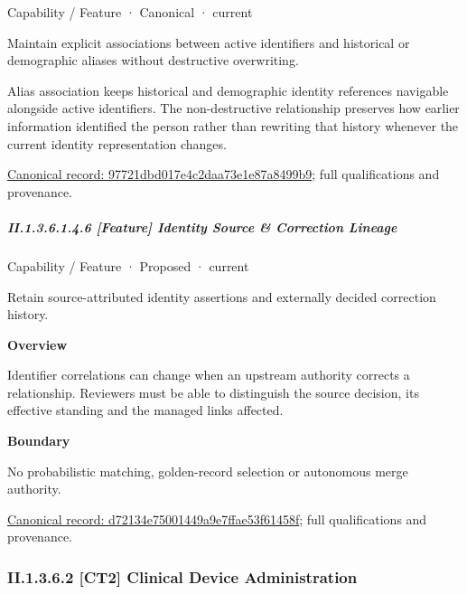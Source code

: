 \label{element:97721dbd017e4c2daa73e1e87a8499b9}
{\small Capability / Feature · Canonical · current}\par

Maintain explicit associations between active identifiers and historical or demographic aliases without destructive overwriting.



Alias association keeps historical and demographic identity references navigable alongside active identifiers. The non-destructive relationship preserves how earlier information identified the person rather than rewriting that history whenever the current identity representation changes.


{\footnotesize \href{../../../../continuum/strategy/capability/feature/97721dbd017e4c2daa73e1e87a8499b9.md}{Canonical record: 97721dbd017e4c2daa73e1e87a8499b9}; full qualifications and provenance.}\par
\subparagraph*{II.1.3.6.1.4.6 [Feature] Identity Source \& Correction Lineage}
\label{navigation:II.1.3.6.1.4.6}

\label{element:d72134e75001449a9e7ffae53f61458f}
{\small Capability / Feature · Proposed · current}\par

Retain source-attributed identity assertions and externally decided correction history.



\textbf{Overview}



Identifier correlations can change when an upstream authority corrects a relationship. Reviewers must be able to distinguish the source decision, its effective standing and the managed links affected.



\textbf{Boundary}



No probabilistic matching, golden-record selection or autonomous merge authority.


{\footnotesize \href{../../../../continuum/strategy/capability/feature/d72134e75001449a9e7ffae53f61458f.md}{Canonical record: d72134e75001449a9e7ffae53f61458f}; full qualifications and provenance.}\par
\subsubsection*{II.1.3.6.2 [CT2] Clinical Device Administration}
\label{navigation:II.1.3.6.2}

